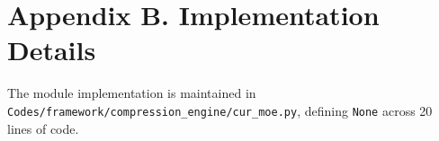 \section*{Appendix B. Implementation Details}
The module implementation is maintained in \texttt{Codes/framework/compression\_engine/cur\_moe.py}, defining \texttt{None} across 20 lines of code.
